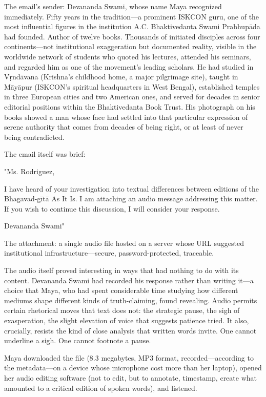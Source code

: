 \documentclass[12pt,twoside]{book}
\begin{document}
The email's sender: Devananda Swami, whose name Maya recognized immediately. Fifty years in the tradition—a prominent ISKCON guru, one of the most influential figures in the institution A.C. Bhaktivedanta Swami Prabhupāda had founded. Author of twelve books. Thousands of initiated disciples across four continents—not institutional exaggeration but documented reality, visible in the worldwide network of students who quoted his lectures, attended his seminars, and regarded him as one of the movement's leading scholars. He had studied in Vṛndāvana (Krishna's childhood home, a major pilgrimage site), taught in Māyāpur (ISKCON's spiritual headquarters in West Bengal), established temples in three European cities and two American ones, and served for decades in senior editorial positions within the Bhaktivedanta Book Trust. His photograph on his books showed a man whose face had settled into that particular expression of serene authority that comes from decades of being right, or at least of never being contradicted.

The email itself was brief:

"Ms. Rodriguez,

I have heard of your investigation into textual differences between editions of the Bhagavad-gītā As It Is. I am attaching an audio message addressing this matter. If you wish to continue this discussion, I will consider your response.

Devananda Swami"

The attachment: a single audio file hosted on a server whose URL suggested institutional infrastructure—secure, password-protected, traceable.

The audio itself proved interesting in ways that had nothing to do with its content. Devananda Swami had recorded his response rather than writing it—a choice that Maya, who had spent considerable time studying how different mediums shape different kinds of truth-claiming, found revealing. Audio permits certain rhetorical moves that text does not: the strategic pause, the sigh of exasperation, the slight elevation of voice that suggests patience tried. It also, crucially, resists the kind of close analysis that written words invite. One cannot underline a sigh. One cannot footnote a pause.

Maya downloaded the file (8.3 megabytes, MP3 format, recorded—according to the metadata—on a device whose microphone cost more than her laptop), opened her audio editing software (not to edit, but to annotate, timestamp, create what amounted to a critical edition of spoken words), and listened.
\end{document}
